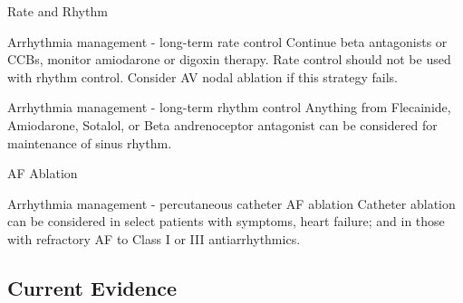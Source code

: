 \documentclass[UKenglish]{beamer}
\begin{document}
\begin{frame}{Rate and Rhythm}
    
    \begin{alertblock}{Arrhythmia management - long-term rate control}
        Continue beta antagonists or CCBs, monitor amiodarone or digoxin therapy. Rate control should not be used with rhythm control. Consider AV nodal ablation if this strategy fails.
    \end{alertblock}
        

    
    \begin{alertblock}{Arrhythmia management - long-term rhythm control}
        Anything from Flecainide, Amiodarone, Sotalol, or Beta andrenoceptor antagonist can be considered for maintenance of sinus rhythm.
    \end{alertblock}
        
\end{frame}

\begin{frame}{AF Ablation}
    \begin{alertblock}{Arrhythmia management - percutaneous catheter AF ablation}
        Catheter ablation can be considered in select patients with symptoms, heart failure; and in those with refractory AF to Class I or III antiarrhythmics.
    \end{alertblock}
    
   

\end{frame}
    
\subsection{Current Evidence}
\end{document}
